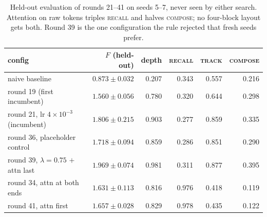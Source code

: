 \begin{table}[h]
\centering
\begin{tabular}{lrrrrr}
\toprule
config & $F$ (held-out) & depth & \textsc{recall} & \textsc{track} & \textsc{compose} \\
\midrule
naive baseline & $0.873 \pm 0.032$ & 0.207 & 0.343 & 0.557 & 0.216 \\
round 19 (first incumbent) & $1.560 \pm 0.056$ & 0.780 & 0.320 & 0.644 & 0.298 \\
round 21, lr $4\times10^{-3}$ (incumbent) & $\mathbf{1.806 \pm 0.215}$ & 0.903 & 0.277 & 0.859 & 0.335 \\
round 36, placeholder control & $1.718 \pm 0.094$ & 0.859 & 0.286 & 0.851 & 0.290 \\
round 39, $\lambda = 0.75$ $+$ attn last & $\mathbf{1.969 \pm 0.074}$ & 0.981 & 0.311 & 0.877 & 0.395 \\
round 34, attn at both ends & $1.631 \pm 0.113$ & 0.816 & $\mathbf{0.976}$ & 0.418 & 0.119 \\
round 41, attn first & $1.657 \pm 0.028$ & 0.829 & $\mathbf{0.978}$ & 0.435 & 0.122 \\
\bottomrule
\end{tabular}
\caption{Held-out evaluation of rounds 21--41 on seeds 5--7, never seen by
either search. Attention on raw tokens triples \textsc{recall} and halves
\textsc{compose}; no four-block layout gets both. Round 39 is the one
configuration the rule rejected that fresh seeds prefer.}
\label{tab:holdout3}
\end{table}
